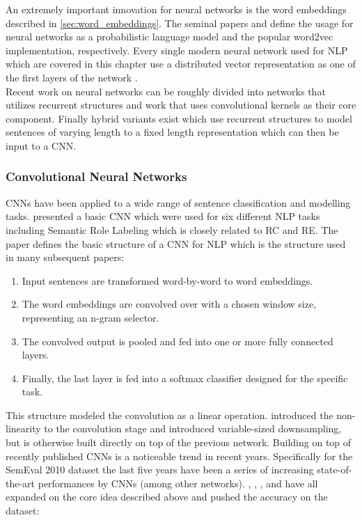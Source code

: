 An extremely important innovation for neural networks is the word embeddings described in \autoref{sec:word_embeddings}. The seminal papers \cite{bengio2001} and \cite{mikolov2013} define the usage for neural networks as a probabilistic language model and the popular word2vec implementation, respectively. Every single modern neural network used for NLP which are covered in this chapter use a distributed vector representation as one of the first layers of the network \cite{att_cnn} \cite{cnn_rank} \cite{re_lstm} \cite{re_cnn}. \\ %


Recent work on neural networks can be roughly divided into networks that utilizes recurrent structures and work that uses convolutional kernels as their core component. Finally hybrid variants exist which use recurrent structures to model sentences of varying length to a fixed length representation which can then be input to a CNN. 

\subsubsection{Convolutional Neural Networks}

CNNs have been applied to a wide range of sentence classification and modelling tasks. \cite{collobert2008} presented a basic CNN which were used for six different NLP tasks including Semantic Role Labeling which is closely related to RC and RE. The paper defines the basic structure of a CNN for NLP which is the structure used in many subsequent papers:

\begin{enumerate}
\item Input sentences are transformed word-by-word to word embeddings.
\item The word embeddings are convolved over with a chosen window size, representing an n-gram selector.
\item The convolved output is pooled and fed into one or more fully connected layers.
\item Finally, the last layer is fed into a softmax classifier designed for the specific task.

\end{enumerate}

This structure modeled the convolution as a linear operation. \cite{kalchbrenner2014} introduced the non-linearity to the convolution stage and introduced variable-sized downsampling, but is otherwise built directly on top of the previous network. 
Building on top of recently published CNNs is a noticeable trend in recent years. Specifically for the SemEval 2010 dataset the last five years have been a series of increasing state-of-the-art performances by CNNs (among other networks). \cite{zeng2014}, \cite{re_cnn}, \cite{cnn_rank}, \cite{xu2015} and \cite{att_cnn} have all expanded on the core idea described above and pushed the accuracy on the dataset:

